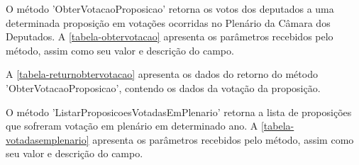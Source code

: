 \documentclass[
	12pt,				%
	openright,			%
	twoside,			%
	a4paper,			%
	english,			%
	french,				%
	spanish,			%
	brazil				%
	]{abntex2}
\begin{document}
O método ’ObterVotacaoProposicao’ retorna os votos dos deputados a uma determinada proposição em votações ocorridas no Plenário da Câmara dos Deputados. A \autoref{tabela-obtervotacao} apresenta os parâmetros recebidos pelo método, assim
como seu valor e descrição do campo.

\begin{table}[htb]
\end{table}

A \autoref{tabela-returnobtervotacao} apresenta os dados do retorno do método ’ObterVotacaoProposicao’, contendo os dados da votação da proposição.

\begin{table}[htb]
\end{table}

O método 'ListarProposicoesVotadasEmPlenario' retorna a lista de proposições que sofreram votação em plenário em determinado ano. A \autoref{tabela-votadasemplenario} apresenta os parâmetros recebidos pelo método, assim
como seu valor e descrição do campo.
\end{document}
